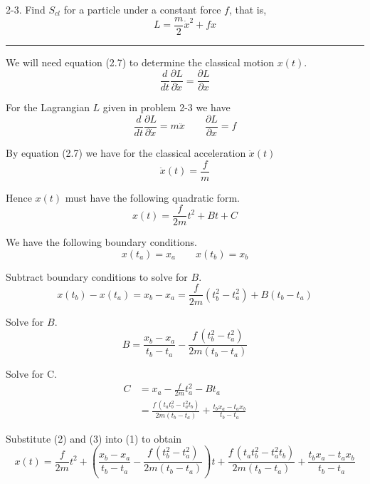 \documentclass[12pt]{article}
\begin{document}
2-3.
Find $S_{cl}$ for a particle under a constant force $f$, that is,
\begin{equation*}
L=\frac{m}{2}\dot x^2+fx
\end{equation*}

\bigskip
\hrule

\bigskip
We will need equation (2.7) to determine the classical motion $x(t)$.
\begin{equation*}
\frac{d}{dt}\frac{\partial L}{\partial\dot x}=\frac{\partial L}{\partial x}
\tag{2.7}
\end{equation*}

For the Lagrangian $L$ given in problem 2-3 we have
\begin{equation*}
\frac{d}{dt}\frac{\partial L}{\partial\dot x}=m\ddot x
\qquad
\frac{\partial L}{\partial x}=f
\end{equation*}

By equation (2.7) we have for the classical acceleration $\ddot x(t)$
\begin{equation*}
\ddot x(t)=\frac{f}{m}
\end{equation*}

Hence $x(t)$ must have the following quadratic form.
\begin{equation*}
x(t)=\frac{f}{2m}t^2+Bt+C
\tag{1}
\end{equation*}

We have the following boundary conditions.
\begin{equation*}
x(t_a)=x_a
\qquad
x(t_b)=x_b
\end{equation*}

Subtract boundary conditions to solve for $B$.
\begin{equation*}
x(t_b)-x(t_a)
=x_b-x_a
=\frac{f}{2m}\left(t_b^2-t_a^2\right)+B(t_b-t_a)
\end{equation*}

Solve for $B$.
\begin{equation*}
B=\frac{x_b-x_a}{t_b-t_a}-\frac{f\,\left(t_b^2-t_a^2\right)}{2m(t_b-t_a)}
\tag{2}
\end{equation*}

Solve for C.
\begin{align*}
C&=x_a-\frac{f}{2m}t_a^2-Bt_a
\\[1ex]
&=\frac{f\,\left(t_a t_b^2 - t_a^2 t_b\right)}{2 m (t_b - t_a)} + \frac{t_b x_a - t_a x_b}{t_b - t_a}
\tag{3}
\end{align*}

Substitute (2) and (3) into (1) to obtain
\begin{equation*}
x(t)=
\frac{f}{2m}t^2
+\left(\frac{x_b-x_a}{t_b-t_a}-\frac{f\,\left(t_b^2-t_a^2\right)}{2m(t_b-t_a)}\right)t
+\frac{f\,\left(t_a t_b^2 - t_a^2 t_b\right)}{2 m (t_b - t_a)} + \frac{t_b x_a - t_a x_b}{t_b - t_a}
\tag{4}
\end{equation*}
\end{document}

